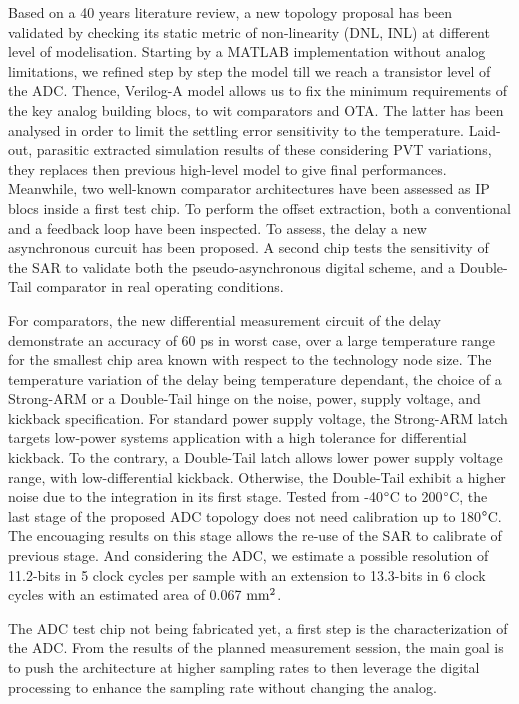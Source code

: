 \begin{mdframed}[linecolor=Prune,linewidth=1]
\begin{small}
Based on a 40 years literature review, a new topology proposal has been validated by checking its static metric of non-linearity (DNL, INL) at different level of modelisation. Starting by a MATLAB implementation without analog limitations, we refined step by step the model till we reach a transistor level of the ADC\@. Thence, Verilog-A model allows us to fix the minimum requirements of the key analog building blocs, to wit comparators and OTA\@. The latter has been analysed in order to limit the settling error sensitivity to the temperature. Laid-out, parasitic extracted simulation results of these considering PVT variations, they replaces then previous high-level model to give final performances. Meanwhile, two well-known comparator architectures have been assessed as IP blocs inside a first test chip. To perform the offset extraction, both a conventional and a feedback loop have been inspected. To assess, the delay a new asynchronous curcuit has been proposed. A second chip tests the sensitivity of the SAR to validate both the pseudo-asynchronous digital scheme, and a Double-Tail comparator in real operating conditions.

For comparators, the new differential measurement circuit of the delay demonstrate an accuracy of 60 ps in worst case, over a large temperature range for the smallest chip area known with respect to the technology node size. The temperature variation of the delay being temperature dependant, the choice of a Strong-ARM or a Double-Tail hinge on the noise, power, supply voltage, and kickback specification. For standard power supply voltage, the Strong-ARM latch targets low-power systems application with a high tolerance for differential kickback. To the contrary, a Double-Tail latch allows lower power supply voltage range, with low-differential kickback. Otherwise, the Double-Tail exhibit a higher noise due to the integration in its first stage. Tested from -40$\degree$C to 200$\degree$C, the last stage of the proposed ADC topology does not need calibration up to 180$\degree$C. The encouaging results on this stage allows the re-use of the SAR to calibrate of previous stage. And considering the ADC, we estimate a possible resolution of 11.2-bits in 5 clock cycles per sample with an extension to 13.3-bits in 6 clock cycles with an estimated area of 0.067 $\rm mm^2$.

The ADC test chip not being fabricated yet, a first step is the characterization of the ADC\@. From the results of the planned measurement session, the main goal is to push the architecture at higher sampling rates to then leverage the digital processing to enhance the sampling rate without changing the analog.
\end{small}
\end{mdframed}

